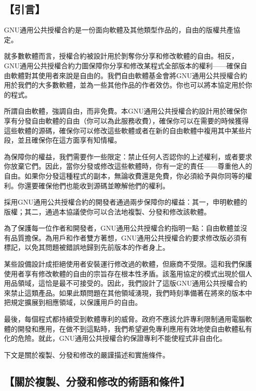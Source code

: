\subsection{【引言】}
GNU通用公共授權合約是一份面向軟體及其他類型作品的，自由的版權共產協定。\par
就多數軟體而言，授權合約被設計用於剝奪你分享和修改軟體的自由。相反，GNU通用公共授權合約力圖保障你分享和修改某程式全部版本的權利——確保自由軟體對其使用者來說是自由的。我們自由軟體基金會將GNU通用公共授權合約用於我們的大多數軟體，並為一些其他作品的作者效仿。你也可以將本協定用於你的程式。\par
所謂自由軟體，強調自由，而非免費。本GNU通用公共授權合約設計用於確保你享有分發自由軟體的自由（你可以為此服務收費），確保你可以在需要的時候獲得這些軟體的源碼，確保你可以修改這些軟體或者在新的自由軟體中複用其中某些片段，並且確保你在這方面享有知情權。\par
為保障你的權益，我們需要作一些限定：禁止任何人否認你的上述權利，或者要求你放棄它們。因此，當你分發或修改這些軟體時，你有一定的責任——尊重他人的自由。如果你分發這種程式的副本，無論收費還是免費，你必須給予與你同等的權利。你還要確保他們也能收到源碼並瞭解他們的權利。\par
採用GNU通用公共授權合約的開發者通過兩步保障你的權益：其一，申明軟體的版權；其二，通過本協議使你可以合法地複製、分發和修改該軟體。\par
為了保護每一位作者和開發者，GNU通用公共授權合約指明一點：自由軟體並沒有品質擔保。為用戶和作者雙方著想，GNU通用公共授權合約要求修改版必須有標記，以免其問題被錯誤地歸到先前版本的作者身上。\par
某些設備設計成拒絕使用者安裝運行修改過的軟體，但廠商不受限。這和我們保護使用者享有修改軟體的自由的宗旨存在根本性矛盾。該濫用協定的模式出現於個人用品領域，這恰是最不可接受的。因此，我們設計了這版GNU通用公共授權合約來禁止這類產品。如果此類問題在其他領域湧現，我們時刻準備著在將來的版本中把規定擴展到相應領域，以保護用戶的自由。\par
最後，每個程式都持續受到軟體專利的威脅。政府不應該允許專利限制通用電腦軟體的開發和應用，在做不到這點時，我們希望避免專利應用有效地使自由軟體私有化的危險。就此，GNU通用公共授權合約保證專利不能使程式非自由化。\par
下文是關於複製、分發和修改的嚴謹描述和實施條件。
\subsection{【關於複製、分發和修改的術語和條件】}
